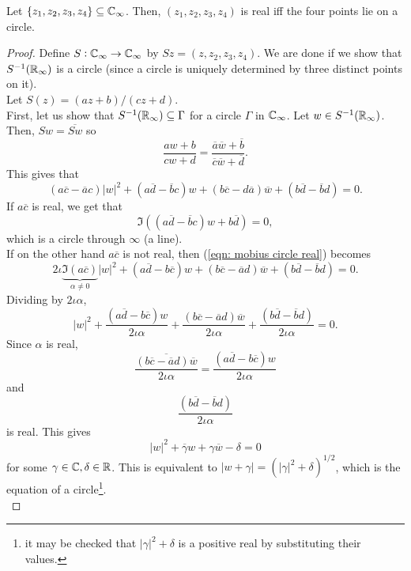 	\begin{lemma}
		\label{thm: mobius real to circle}
		Let $\{z_1,z_2,z_3,z_4\} \subseteq \mathbb{C}_\infty$. Then, $(z_1,z_2,z_3,z_4)$ is real iff the four points lie on a circle.
	\end{lemma}
	\begin{proof}
		Define $S:\mathbb{C}_\infty\to\mathbb{C}_\infty$ by $Sz = (z,z_2,z_3,z_4)$. We are done if we show that $S^{-1}(\mathbb{R}_\infty)$ is a circle (since a circle is uniquely determined by three distinct points on it).\\
		Let $S(z) = (az+b)/(cz+d)$.\\

		First, let us show that $S^{-1}(\mathbb{R}_\infty) \subseteq \Gamma$ for a circle $\Gamma$ in $\mathbb{C}_\infty$. Let $w \in S^{-1}(\mathbb{R}_\infty)$. Then, $Sw = \overline{Sw}$ so
		\[ \frac{aw+b}{cw+d} = \frac{\overline{a}\overline{w} + \overline{b}}{\overline{c}\overline{w} + \overline{d}}. \]
		This gives that
		\begin{equation}
			\tag{$*$}
			\label{eqn: mobius circle real}
			(a\overline{c} - \overline{a}c)|w|^2 + (a\overline{d} - \overline{b}c)w + (b\overline{c} - d\overline{a})\overline{w} + (b\overline{d} - \overline{b}d) = 0.
		\end{equation}
		If $a\overline{c}$ is real, we get that
		\[ \Im\left((a\overline{d}-\overline{b}c)w + b\overline{d}\right) = 0, \]
		which is a circle through $\infty$ (a line).\\
		If on the other hand $a\overline{c}$ is not real, then (\ref{eqn: mobius circle real}) becomes
		\[ 2\iota\underbrace{\Im(a\overline{c})}_{\alpha \ne 0}|w|^2 + (a\overline{d} - b\overline{c})w + (b\overline{c} - \overline{a}d)\overline{w} + (b\overline{d} - \overline{b}d) = 0. \]
		Dividing by $2\iota\alpha$,
		\[ |w|^2 + \frac{(a\overline{d} - b\overline{c})w}{2\iota\alpha} + \frac{(b\overline{c} - \overline{a}d)\overline{w}}{2\iota\alpha} + \frac{(b\overline{d} - \overline{b}d)}{2\iota\alpha} = 0. \]
		Since $\alpha$ is real,
		\[ \overline{\frac{(b\overline{c} - \overline{a}d)\overline{w}}{2\iota\alpha}} = \frac{(a\overline{d} - b\overline{c})w}{2\iota\alpha} \]
		and
		\[ \frac{(b\overline{d} - \overline{b}d)}{2\iota\alpha} \]
		is real. This gives
		\[ |w|^2 + \overline{\gamma}w + \gamma\overline{w} - \delta = 0 \]
		for some $\gamma \in \mathbb{C}, \delta \in \mathbb{R}$. This is equivalent to $|w+\gamma| = (|\gamma|^2 + \delta)^{1/2}$, which is the equation of a circle\footnote{it may be checked that $|\gamma|^2 + \delta$ is a positive real by substituting their values.}.\\


\end{proof}
